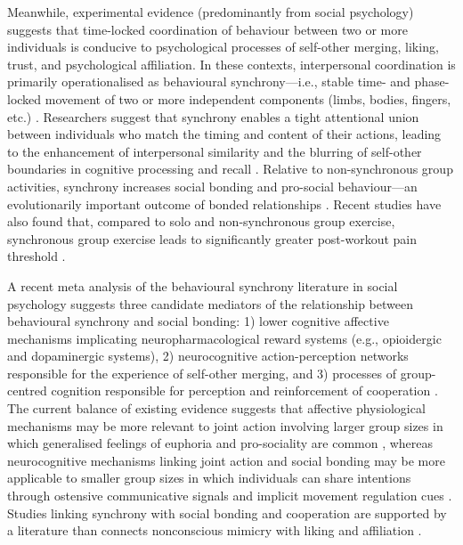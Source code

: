 \begin{CJK}{UTF8}{gbsn}
Meanwhile, experimental evidence (predominantly from social psychology) suggests that time-locked coordination of behaviour between two or more individuals is conducive to psychological processes of self-other merging, liking, trust, and psychological affiliation.  In these contexts, interpersonal coordination is primarily operationalised as behavioural synchrony---i.e., stable time- and phase-locked movement of two or more independent components (limbs, bodies, fingers, etc.) \citep{Pikovsky2007}. Researchers suggest that synchrony enables a tight attentional union between individuals who match the timing and content of their actions, leading to the enhancement of interpersonal similarity and the blurring of self-other boundaries in cognitive processing and recall \citep{Cohen2017}.  Relative to non-synchronous group activities, synchrony increases social bonding and pro-social behaviour---an evolutionarily important outcome of bonded relationships \citep{Reddish2013,Reddish2013a,Wiltermuth2009}.  Recent studies have also found that, compared to solo and non-synchronous group exercise, synchronous group exercise leads to significantly greater post-workout pain threshold \citep{Cohen2009,Sullivan2014,Sullivan2013a, Sullivan2013b}.

A recent meta analysis of the behavioural synchrony literature in social psychology suggests three candidate mediators of the relationship between behavioural synchrony and social bonding: 1) lower cognitive affective mechanisms implicating neuropharmacological reward systems (e.g., opioidergic and dopaminergic systems), 2) neurocognitive action-perception networks responsible for the experience of self-other merging, and 3) processes of group-centred cognition responsible for perception and reinforcement of cooperation \citep{Mogan2017}.  The current balance of existing evidence suggests that affective physiological mechanisms may be more relevant to joint action involving larger group sizes in which generalised feelings of euphoria and pro-sociality are common \citep[e.g., mass religious rituals or music festivals, see][]{Weinstein2016}, whereas neurocognitive mechanisms linking joint action and social bonding may be more applicable to smaller group sizes in which individuals can share intentions through ostensive communicative signals and implicit movement regulation cues \citep{Semin2008,Frith2010}.  Studies linking synchrony with social bonding and cooperation are supported by a literature than connects nonconscious mimicry with liking and affiliation \citep{VanBaaren2009}.


\end{CJK}
